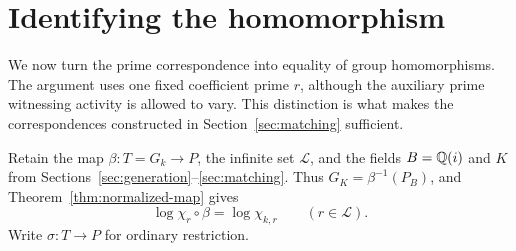 \section{Identifying the homomorphism}\label{sec:identification}

We now turn the prime correspondence into equality of group homomorphisms. The argument uses one fixed coefficient prime $r$, although the auxiliary prime witnessing activity is allowed to vary. This distinction is what makes the correspondences constructed in Section~\ref{sec:matching} sufficient.

Retain the map $\beta:T=G_k\to P$, the infinite set $\mathcal L$, and the fields $B=\mathbb Q(i)$ and $K$ from Sections~\ref{sec:generation}--\ref{sec:matching}. Thus $G_K=\beta^{-1}(P_B)$, and Theorem~\ref{thm:normalized-map} gives
\begin{equation}\label{eq:fixed-r-log}
 \log\chi_r\circ\beta=\log\chi_{k,r}\qquad(r\in\mathcal L).
\end{equation}
Write $\sigma:T\to P$ for ordinary restriction.

